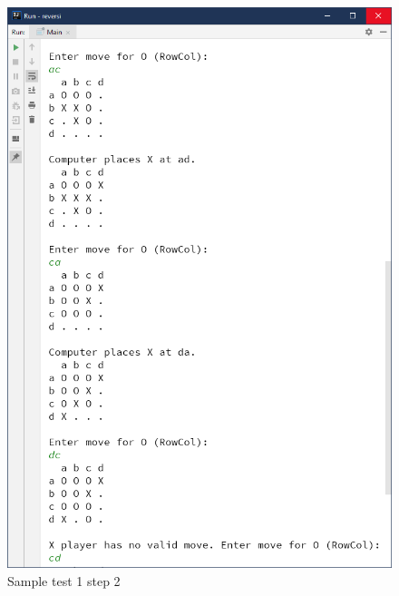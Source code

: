 \documentclass[a4paper]{report}
\begin{document}
\begin{figure}
  \centering
  \includegraphics[width=12cm]{Capture2.png}
  \caption{Sample test 1 step 2}\label{3}
\end{figure}
\end{document}
